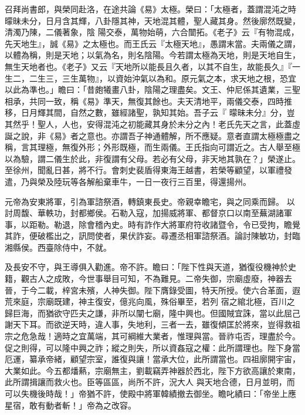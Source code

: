 \begin{pinyinscope}
 召拜尚書郎，與榮同赴洛，在途共論《易》太極。榮曰：「太極者，蓋謂混沌之時曚昧未分，日月含其輝，八卦隱其神，天地混其體，聖人藏其身。然後廓然既變，清濁乃陳，二儀著象，陰
 陽交泰，萬物始萌，六合闓拓。《老子》云『有物混成，先天地生』，誠《易》之太極也。而王氏云『太極天地』，愚謂末當。夫兩儀之謂，以體為稱，則是天地；以氣為名，則名陰陽。今若謂太極為天地，則是天地自生，無生天地者也。《老子》又云『天地所以能長且久者，以其不自生，故能長久』『一生二，二生三，三生萬物』，以資始沖氣以為和。原元氣之本，求天地之根，恐宜以此為準也。」瞻曰：「昔皰犧畫八卦，陰陽之理盡矣。文王、仲尼係其遺業，三聖相承，共同一致，稱《易》準天，無復其餘也。夫天清地平，兩儀交泰，四時推移，日月輝其間，自然之數，雖經諸聖，孰知其始。吾子云『
 曚昧未分』分，豈其然乎！聖人，人也，安得混沌之初能藏其身於未分之內！老氏先天之言，此蓋虛誕之說，非《易》者之意也。亦謂吾子神通體解，所不應疑。意者直謂太極極盡之稱，言其理極，無復外形；外形既極，而生兩儀。王氏指向可謂近之。古人舉至極以為驗，謂二儀生於此，非復謂有父母。若必有父母，非天地其孰在？」榮遂止。至徐州，聞亂日甚，將不行。會刺史裴盾得東海王越書，若榮等顧望，以軍禮發遣，乃與榮及陸玩等各解船棄車牛，一日一夜行三百里，得還揚州。



 元帝為安東將軍，引為軍諮祭酒，轉鎮東長史。帝親幸瞻宅，與之同乘而歸。
 以討周馥、華軼功，封都鄉侯。石勒入寇，加揚威將軍、都督京口以南至蕪湖諸軍事，以距勒。勒退，除會稽內史。時有詐作大將軍府符收諸暨令，令已受拘，瞻覺其詐，便破檻出之，訊問使者，果伏詐妄。尋遷丞相軍諮祭酒。論討陳敏功，封臨湘縣侯。西臺除侍中，不就。



 及長安不守，與王導俱入勸進。帝不許。瞻曰：「陛下性與天道，猶復役機神於史籍，觀古人之成敗，今世事舉目可知，不為難見。二帝失御，宗廟虛廢，神器去晉，于今二載，梓宮未殯，人神失御。陛下膺錄受圖，特天所授。使六合革面，遐荒來庭，宗廟既建，神主復安，億兆向風，殊俗畢至，若列
 宿之綰北極，百川之歸巨海，而猶欲守匹夫之謙，非所以闡七廟，隆中興也。但國賊宜誅，當以此屈己謝天下耳。而欲逆天時，違人事，失地利，三者一去，雖復傾匡於將來，豈得救祖宗之危急哉！適時之宜萬端，其可綱維大業者，惟理與當。晉祚屯否，理盡於今。促之則得，可以隆中興之祚；縱之則失，所以資姦寇之權：此所謂理也。陛下身當厄運，纂承帝緒，顧望宗室，誰復與讓！當承大位，此所謂當也。四祖廓開宇宙，大業如此。今五都燔爇，宗廟無主，劉載竊弄神器於西北，陛下方欲高讓於東南，此所謂揖讓而救火也。臣等區區，尚所不許，況大人
 與天地合德，日月並明，而可以失機後時哉！」帝猶不許，使殿中將軍韓績撤去御坐。瞻叱績曰：「帝坐上應星宿，敢有動者斬！」帝為之改容。




\end{pinyinscope}
